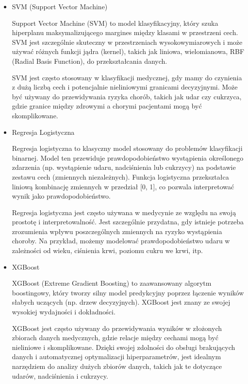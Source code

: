 \documentclass[onecolumn,12pt]{article}
\begin{document}
\begin{itemize}
\item{SVM (Support Vector Machine)}

Support Vector Machine (SVM) to model klasyfikacyjny, który szuka hiperplanu maksymalizującego margines między klasami w przestrzeni cech. SVM jest szczególnie skuteczny w przestrzeniach wysokowymiarowych i może używać różnych funkcji jądra (kernel), takich jak liniowa, wielomianowa, RBF (Radial Basis Function), do przekształcania danych.

SVM jest często stosowany w klasyfikacji medycznej, gdy mamy do czynienia z dużą liczbą cech i potencjalnie nieliniowymi granicami decyzyjnymi. Może być używany do przewidywania ryzyka chorób, takich jak udar czy cukrzyca, gdzie granice między zdrowymi a chorymi pacjentami mogą być skomplikowane.

\item{Regresja Logistyczna}

Regresja logistyczna to klasyczny model stosowany do problemów klasyfikacji binarnej. Model ten przewiduje prawdopodobieństwo wystąpienia określonego zdarzenia (np. wystąpienie udaru, nadciśnienia lub cukrzycy) na podstawie zestawu cech (zmiennych niezależnych). Funkcja logistyczna przekształca liniową kombinację zmiennych w przedział [0, 1], co pozwala interpretować wynik jako prawdopodobieństwo.

Regresja logistyczna jest często używana w medycynie ze względu na swoją prostotę i interpretowalność. Jest szczególnie przydatna, gdy istnieje potrzeba zrozumienia wpływu poszczególnych zmiennych na ryzyko wystąpienia choroby. Na przykład, możemy modelować prawdopodobieństwo udaru w zależności od wieku, ciśnienia krwi, poziomu cukru we krwi, itp.

\item{XGBoost}

XGBoost (Extreme Gradient Boosting) to zaawansowany algorytm boostingowy, który tworzy silny model predykcyjny poprzez łączenie wyników słabych uczących (np. drzew decyzyjnych). XGBoost jest znany ze swojej wysokiej wydajności i dokładności.

XGBoost jest często używany do przewidywania wyników w złożonych zbiorach danych medycznych, gdzie relacje między cechami mogą być nieliniowe i skomplikowane. Dzięki swojej zdolności do obsługi brakujących danych i automatycznej optymalizacji hiperparametrów, jest idealnym narzędziem do analizy dużych zbiorów danych, takich jak te dotyczące udarów, nadciśnienia i cukrzycy.
\end{itemize}
\end{document}
